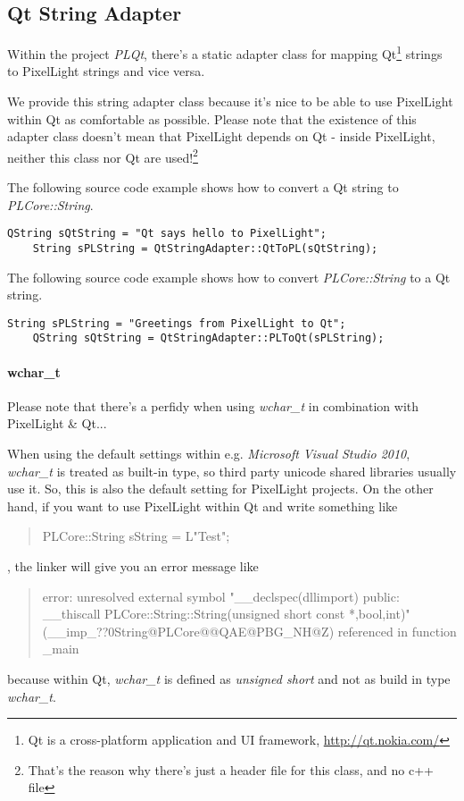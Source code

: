 \subsection{Qt String Adapter}
Within the project \emph{PLQt}, there's a static adapter class for mapping Qt\footnote{Qt is a cross-platform application and UI framework, \url{http://qt.nokia.com/}} strings to PixelLight strings and vice versa.

We provide this string adapter class because it's nice to be able to use PixelLight within Qt as comfortable as possible. Please note that the existence of this adapter class doesn't mean that PixelLight depends on Qt - inside PixelLight, neither this class nor Qt are used!\footnote{That's the reason why there's just a header file for this class, and no c++ file}

The following source code example shows how to convert a Qt string to \emph{PLCore::String}.
\begin{lstlisting}[caption=Qt string to PLCore::String]
	QString sQtString = "Qt says hello to PixelLight";
	String sPLString = QtStringAdapter::QtToPL(sQtString);
\end{lstlisting}

The following source code example shows how to convert \emph{PLCore::String} to a Qt string.
\begin{lstlisting}[caption=PLCore::String string to Qt]
	String sPLString = "Greetings from PixelLight to Qt";
	QString sQtString = QtStringAdapter::PLToQt(sPLString);
\end{lstlisting}


\paragraph{wchar\_t}
Please note that there's a perfidy when using \emph{wchar\_t} in combination with PixelLight \& Qt...

When using the default settings within e.g. \emph{Microsoft Visual Studio 2010}, \emph{wchar\_t} is treated as built-in type, so third party unicode shared libraries usually use it. So, this is also the default setting for PixelLight projects. On the other hand, if you want to use PixelLight within Qt and write something like \begin{quote}PLCore::String sString = L"Test";\end{quote}, the linker will give you an error message like \begin{quote}error:  unresolved external symbol "\_\_declspec(dllimport) public: \_\_thiscall PLCore::String::String(unsigned short const *,bool,int)" (\_\_imp\_??0String@PLCore@@QAE@PBG\_NH@Z) referenced in function \_main\end{quote} because within Qt, \emph{wchar\_t} is defined as \emph{unsigned short} and not as build in type \emph{wchar\_t}.

